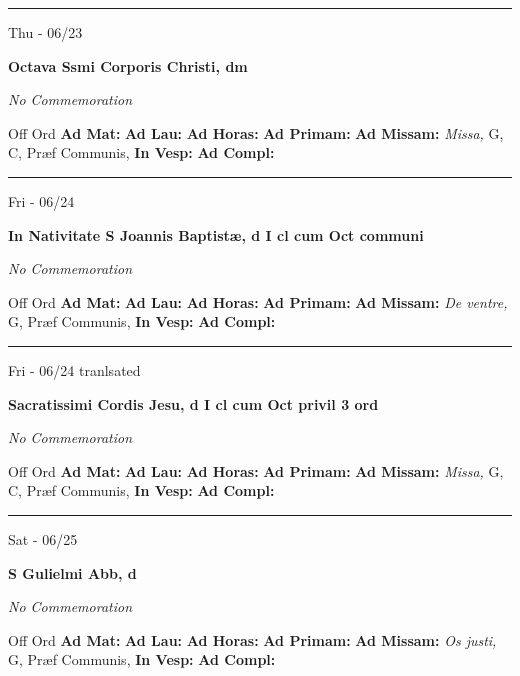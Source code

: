 \documentclass[letterpaper, 10pt]{article}
\begin{document}
\hrule
\begin{center}
Thu - 06/23
\end{center}\textbf{ \large Octava Ssmi Corporis Christi, \textnormal{\normalsize dm}}

\textit{No Commemoration}\begin{justify}
Off Ord
\textbf{Ad Mat: }
\textbf{Ad Lau: }
\textbf{Ad Horas: }
\textbf{Ad Primam: }
\textbf{Ad Missam:} \textit{Missa, } G, C, Præf Communis, 
\textbf{In Vesp: }
\textbf{Ad Compl: }\end{justify}



\hrule
\begin{center}
Fri - 06/24
\end{center}\textbf{ \large In Nativitate S Joannis Baptistæ, \textnormal{\normalsize d I cl cum Oct communi}}

\textit{No Commemoration}\begin{justify}
Off Ord
\textbf{Ad Mat: }
\textbf{Ad Lau: }
\textbf{Ad Horas: }
\textbf{Ad Primam: }
\textbf{Ad Missam:} \textit{De ventre, } G, Præf Communis, 
\textbf{In Vesp: }
\textbf{Ad Compl: }\end{justify}



\hrule
\begin{center}
Fri - 06/24 tranlsated
\end{center}\textbf{ \large Sacratissimi Cordis Jesu, \textnormal{\normalsize d I cl cum Oct privil 3 ord}}

\textit{No Commemoration}\begin{justify}
Off Ord
\textbf{Ad Mat: }
\textbf{Ad Lau: }
\textbf{Ad Horas: }
\textbf{Ad Primam: }
\textbf{Ad Missam:} \textit{Missa, } G, C, Præf Communis, 
\textbf{In Vesp: }
\textbf{Ad Compl: }\end{justify}



\hrule
\begin{center}
Sat - 06/25
\end{center}\textbf{ \large S Gulielmi Abb, \textnormal{\normalsize d}}

\textit{No Commemoration}\begin{justify}
Off Ord
\textbf{Ad Mat: }
\textbf{Ad Lau: }
\textbf{Ad Horas: }
\textbf{Ad Primam: }
\textbf{Ad Missam:} \textit{Os justi, } G, Præf Communis, 
\textbf{In Vesp: }
\textbf{Ad Compl: }\end{justify}
\end{document}

